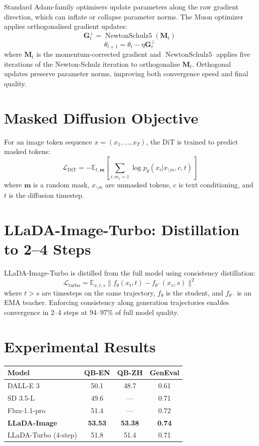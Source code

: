 \documentclass[10pt,twocolumn]{article}
\begin{document}
Standard Adam-family optimisers update parameters along the raw
gradient direction, which can inflate or collapse parameter norms.
The Muon optimizer applies orthogonalised gradient updates:
\[
  \mathbf{G}_t^\perp = \operatorname{NewtonSchulz5}(\mathbf{M}_t)
\]
\[
  \theta_{t+1} = \theta_t - \eta \mathbf{G}_t^\perp
\]
where $\mathbf{M}_t$ is the momentum-corrected gradient and
$\operatorname{NewtonSchulz5}$ applies five iterations of the
Newton-Schulz iteration to orthogonalise $\mathbf{M}_t$. Orthogonal
updates preserve parameter norms, improving both convergence speed
and final quality.

\section{Masked Diffusion Objective}

For an image token sequence $x = (x_1,\ldots,x_T)$, the DiT is
trained to predict masked tokens:
\[
  \mathcal{L}_\text{DiT} =
  -\mathbb{E}_{t,\mathbf{m}}\!
  \left[ \sum_{i: m_i=1} \log p_\theta(x_i | x_{\setminus m}, c, t) \right]
\]
where $\mathbf{m}$ is a random mask, $x_{\setminus m}$ are unmasked
tokens, $c$ is text conditioning, and $t$ is the diffusion timestep.

\section{LLaDA-Image-Turbo: Distillation to 2--4 Steps}

LLaDA-Image-Turbo is distilled from the full model using consistency
distillation:
\[
  \mathcal{L}_\text{turbo} =
  \mathbb{E}_{x, t, s}
  \bigl\| f_\theta(x_t, t) - f_{\theta^-}(x_s, s) \bigr\|^2
\]
where $t > s$ are timesteps on the same trajectory, $f_\theta$ is the
student, and $f_{\theta^-}$ is an EMA teacher. Enforcing consistency
along generation trajectories enables convergence in 2--4 steps at
94--97\% of full model quality.

\section{Experimental Results}

\begin{center}
\begin{tabular}{lccc}
\toprule
Model & QB-EN & QB-ZH & GenEval \\
\midrule
DALL-E 3         & 50.1 & 48.7 & 0.61 \\
SD 3.5-L         & 49.6 & ---  & 0.71 \\
Flux-1.1-pro     & 51.4 & ---  & 0.72 \\
\textbf{LLaDA-Image} & \textbf{53.53} & \textbf{53.38} & \textbf{0.74} \\
LLaDA-Turbo (4-step) & 51.8 & 51.4 & 0.71 \\
\bottomrule
\end{tabular}
\end{center}
\end{document}
